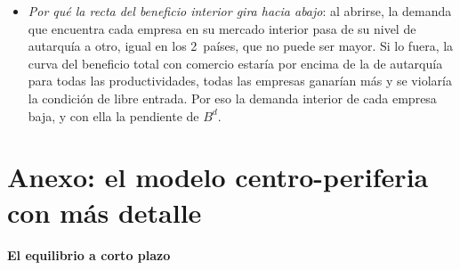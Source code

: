\documentclass[11pt]{article}
\begin{document}
\begin{itemize}
\item \emph{Por qué la recta del beneficio interior gira hacia abajo}\nocite{MelitzRedding2014Heterogeneous}: al abrirse, la demanda que encuentra cada empresa en su mercado interior pasa de su nivel de autarquía a otro, igual en los 2~países, que no puede ser mayor. Si lo fuera, la curva del beneficio total con comercio estaría por encima de la de autarquía para todas las productividades, todas las empresas ganarían más y se violaría la condición de libre entrada. Por eso la demanda interior de cada empresa baja, y con ella la pendiente de $B^d$.\findemo
\end{itemize}

\section{Anexo: el modelo centro-periferia con más detalle}\label{anexo:centro-periferia}

\paragraph{El equilibrio a corto plazo}
\end{document}
